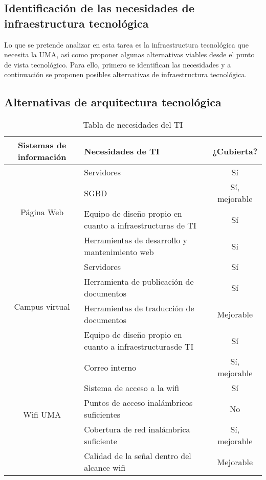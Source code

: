 \documentclass[11pt,a4paper,spanish,twoside]{book}
\begin{document}
\begin{itemize}
\section{Identificación de las necesidades de infraestructura tecnológica}
Lo que se pretende analizar en esta tarea es la infraestructura tecnológica
que necesita la UMA, así como proponer algunas alternativas viables desde
el punto de vista tecnológico. Para ello, primero se identifican las
necesidades y a continuación se proponen posibles alternativas de
infraestructura tecnológica. 

\subsection{Alternativas de arquitectura tecnológica}

\begin{table}[!h]
\centering
  \begin{tabular}{clc}
    \textbf{Sistemas de información} & \textbf{Necesidades de TI} &
    \textbf{¿Cubierta?} \\ \hline 
    \hline \hline
     \multirow{4}{*}{Página Web}
     & Servidores & Sí \\
     & SGBD & Sí, mejorable \\
     & Equipo de diseño propio en cuanto a infraestructuras de TI & Sí\\
     & Herramientas de desarrollo y mantenimiento web & Si\\

     \multirow{4}{*}{Campus virtual}
     & Servidores & Sí\\
     & Herramienta de publicación de documentos & Sí\\
     & Herramientas de traducción de documentos & Mejorable\\
     & Equipo de diseño propio en cuanto a infraestructurasde TI & Sí\\
     & Correo interno & Sí, mejorable\\

     \multirow{3}{*}{Wifi UMA}
     & Sistema de acceso a la wifi & Sí\\
     & Puntos de acceso inalámbricos suficientes & No\\
     & Cobertura de red inalámbrica suficiente & Sí, mejorable\\
     & Calidad de la señal dentro del alcance wifi & Mejorable\\
          
  \end{tabular}
\caption{Tabla de necesidades del TI}
\end{table}


\end{itemize}
\end{document}
